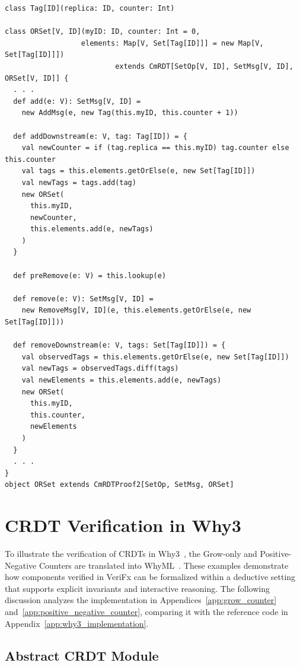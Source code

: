 \begin{lstlisting}[caption={The implementation of a Observed-Remove Set in VeriFx}, label={list:orset}]
class Tag[ID](replica: ID, counter: Int)

class ORSet[V, ID](myID: ID, counter: Int = 0,
                  elements: Map[V, Set[Tag[ID]]] = new Map[V, Set[Tag[ID]]])
                          extends CmRDT[SetOp[V, ID], SetMsg[V, ID], ORSet[V, ID]] {
  . . .
  def add(e: V): SetMsg[V, ID] =
    new AddMsg(e, new Tag(this.myID, this.counter + 1))

  def addDownstream(e: V, tag: Tag[ID]) = {
    val newCounter = if (tag.replica == this.myID) tag.counter else this.counter
    val tags = this.elements.getOrElse(e, new Set[Tag[ID]])
    val newTags = tags.add(tag)
    new ORSet(
      this.myID,
      newCounter,
      this.elements.add(e, newTags)
    )
  }

  def preRemove(e: V) = this.lookup(e)

  def remove(e: V): SetMsg[V, ID] =
    new RemoveMsg[V, ID](e, this.elements.getOrElse(e, new Set[Tag[ID]]))

  def removeDownstream(e: V, tags: Set[Tag[ID]]) = {
    val observedTags = this.elements.getOrElse(e, new Set[Tag[ID]])
    val newTags = observedTags.diff(tags)
    val newElements = this.elements.add(e, newTags)
    new ORSet(
      this.myID,
      this.counter,
      newElements
    )
  }
  . . .
}
object ORSet extends CmRDTProof2[SetOp, SetMsg, ORSet]
\end{lstlisting}

\section{CRDT Verification in Why3}
\label{sec:crdt_verification_why3}

To illustrate the verification of CRDTs in Why3~\cite{why3}, the Grow-only and Positive-Negative Counters are translated into WhyML~\cite{whyml}. These examples demonstrate how components verified in VeriFx can be formalized within a deductive setting that supports explicit invariants and interactive reasoning. The following discussion analyzes the implementation in Appendices~\ref{app:grow_counter} and~\ref{app:positive_negative_counter}, comparing it with the reference code in Appendix~\ref{app:why3_implementation}.

\subsection{Abstract CRDT Module}
\label{sub:crdt_module}

